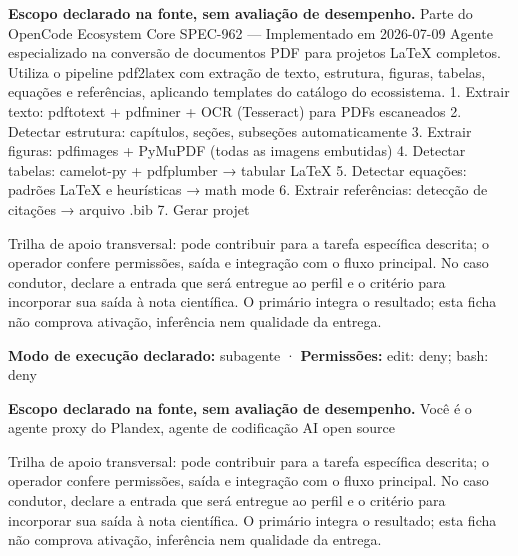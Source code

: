 
\begin{descricao}
\textbf{Escopo declarado na fonte, sem avaliação de desempenho.}
Parte do OpenCode Ecosystem Core SPEC-962 — Implementado em 2026-07-09 Agente especializado na conversão de documentos PDF para projetos LaTeX completos. Utiliza o pipeline pdf2latex com extração de texto, estrutura, figuras, tabelas, equações e referências, aplicando templates do catálogo do ecossistema. 1. Extrair texto: pdftotext + pdfminer + OCR (Tesseract) para PDFs escaneados 2. Detectar estrutura: capítulos, seções, subseções automaticamente 3. Extrair figuras: pdfimages + PyMuPDF (todas as imagens embutidas) 4. Detectar tabelas: camelot-py + pdfplumber → tabular LaTeX 5. Detectar equações: padrões LaTeX e heurísticas → math mode 6. Extrair referências: detecção de citações → arquivo .bib 7. Gerar projet
\end{descricao}

\begin{funcao}
Trilha de apoio transversal: pode contribuir para a tarefa específica descrita; o operador confere permissões, saída e integração com o fluxo principal. No caso condutor, declare a entrada que será entregue ao perfil e o critério para incorporar sua saída à nota científica. O primário integra o resultado; esta ficha não comprova ativação, inferência nem qualidade da entrega.
\end{funcao}

\begin{arquitetura}
\textbf{Modo de execução declarado:} subagente · \textbf{Permissões:} edit: deny; bash: deny
\end{arquitetura}


\begin{descricao}
\textbf{Escopo declarado na fonte, sem avaliação de desempenho.}
Você é o agente proxy do Plandex, agente de codificação AI open source
\end{descricao}

\begin{funcao}
Trilha de apoio transversal: pode contribuir para a tarefa específica descrita; o operador confere permissões, saída e integração com o fluxo principal. No caso condutor, declare a entrada que será entregue ao perfil e o critério para incorporar sua saída à nota científica. O primário integra o resultado; esta ficha não comprova ativação, inferência nem qualidade da entrega.
\end{funcao}

